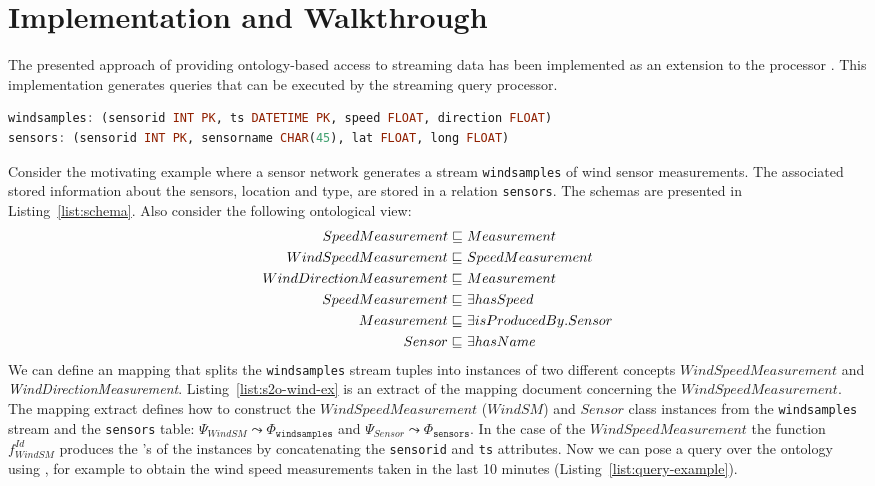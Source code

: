 \section{Implementation and Walkthrough}
\label{execution}

The presented approach of providing ontology-based access to streaming data has been implemented as an extension to the \odemapster processor \cite{Barrasa_04}. 
This implementation generates \sneeql queries that can be executed by the streaming query processor.

\begin{lstlisting}[style=SNEEqlStyle,language=Haskell,float,label=list:schema,caption=Relational schema of the data source.]
windsamples: (sensorid INT PK, ts DATETIME PK, speed FLOAT, direction FLOAT)
sensors: (sensorid INT PK, sensorname CHAR(45), lat FLOAT, long FLOAT)
\end{lstlisting}

Consider the motivating example where a sensor network generates a stream \texttt{windsamples} of wind sensor measurements.
The associated stored information about the sensors, \eg location and type, are stored in a relation \texttt{sensors}.
The schemas are presented in Listing~\ref{list:schema}. Also consider the following ontological view:
\begin{align*}%
\small
SpeedMeasurement \sqsubseteq\ & Measurement \\
WindSpeedMeasurement \sqsubseteq\ & SpeedMeasurement \\
WindDirectionMeasurement \sqsubseteq\ & Measurement \\
SpeedMeasurement \sqsubseteq\ & \exists hasSpeed \\
Measurement \sqsubseteq\ & \exists isProducedBy.Sensor \\
Sensor \sqsubseteq\ & \exists hasName
\end{align*}
We can define an \stwoo mapping that splits the \texttt{windsamples} stream tuples into instances of two different concepts $WindSpeedMeasurement$ and \textit{WindDirectionMeasurement}. 
Listing~\ref{list:s2o-wind-ex} is an extract of the \stwoo mapping document concerning the $WindSpeedMeasurement$.
The mapping extract defines how to construct the $WindSpeedMeasurement$ ($WindSM$) and $Sensor$ class instances from the \texttt{windsamples} stream and the \texttt{sensors} table: $\Psi_{WindSM}\leadsto \Phi_{\mathtt{windsamples}}$ and $\Psi_{Sensor}\leadsto \Phi_{\mathtt{sensors}}$. 
In the case of the $WindSpeedMeasurement$ the function $f_{WindSM}^{Id}$ produces the \uri's of the instances by concatenating the \texttt{sensorid} and \texttt{ts} attributes.
Now we can pose a query over the ontology using \sparqlstr, for example to obtain the wind speed measurements taken in the last 10 minutes (Listing~\ref{list:query-example}).

